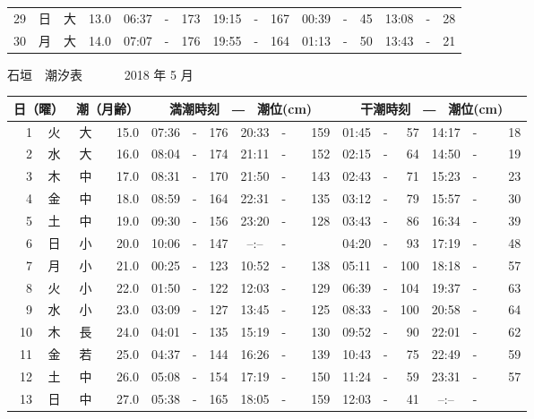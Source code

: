 \documentclass[12pt.a4j]{jsarticle}
\begin{document}
\begin{center}
\begin{table}[ht]
\begin{tabular}{|rc|cr|ccrccr|ccrccr|}
29 & 日 & 大 & 13.0 &  06:37 &-& 173  &  19:15 &-& 167  &   00:39 &-&  45  &   13:08 &-&  28  \\
30 & 月 & 大 & 14.0 &  07:07 &-& 176  &  19:55 &-& 164  &   01:13 &-&  50  &   13:43 &-&  21  \\
   \hline
   \end{tabular}
\end{table}
\newpage
 {\LARGE 石垣　潮汐表　　　}
 {\large 2018 年  5 月}\\
 \begin{table}[ht]
    \begin{tabular}{|rc|cr|ccrccr|ccrccr|}
    \hline
    \multicolumn{2}{|c|}{日（曜）} & \multicolumn{2}{c|}{潮（月齢）} & \multicolumn{6}{c|}{満潮時刻　―　潮位(cm)} & \multicolumn{6}{c|}{干潮時刻　―　潮位(cm)} \\
 \hline
 1 & 火 & 大 & 15.0 &  07:36 &-& 176  &  20:33 &-& 159  &   01:45 &-&  57  &   14:17 &-&  18  \\
 2 & 水 & 大 & 16.0 &  08:04 &-& 174  &  21:11 &-& 152  &   02:15 &-&  64  &   14:50 &-&  19  \\
 3 & 木 & 中 & 17.0 &  08:31 &-& 170  &  21:50 &-& 143  &   02:43 &-&  71  &   15:23 &-&  23  \\
 4 & 金 & 中 & 18.0 &  08:59 &-& 164  &  22:31 &-& 135  &   03:12 &-&  79  &   15:57 &-&  30  \\
 5 & 土 & 中 & 19.0 &  09:30 &-& 156  &  23:20 &-& 128  &   03:43 &-&  86  &   16:34 &-&  39  \\
 6 & 日 & 小 & 20.0 &  10:06 &-& 147  &  --:-- &-&~~~~~ &   04:20 &-&  93  &   17:19 &-&  48  \\
 7 & 月 & 小 & 21.0 &  00:25 &-& 123  &  10:52 &-& 138  &   05:11 &-& 100  &   18:18 &-&  57  \\
 8 & 火 & 小 & 22.0 &  01:50 &-& 122  &  12:03 &-& 129  &   06:39 &-& 104  &   19:37 &-&  63  \\
 9 & 水 & 小 & 23.0 &  03:09 &-& 127  &  13:45 &-& 125  &   08:33 &-& 100  &   20:58 &-&  64  \\
10 & 木 & 長 & 24.0 &  04:01 &-& 135  &  15:19 &-& 130  &   09:52 &-&  90  &   22:01 &-&  62  \\
11 & 金 & 若 & 25.0 &  04:37 &-& 144  &  16:26 &-& 139  &   10:43 &-&  75  &   22:49 &-&  59  \\
12 & 土 & 中 & 26.0 &  05:08 &-& 154  &  17:19 &-& 150  &   11:24 &-&  59  &   23:31 &-&  57  \\
13 & 日 & 中 & 27.0 &  05:38 &-& 165  &  18:05 &-& 159  &   12:03 &-&  41  &   --:-- &-&~~~~~ \\

\end{tabular}
\end{table}
\end{center}
\end{document}
